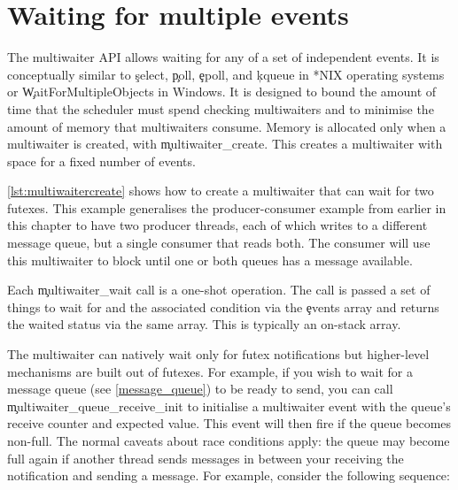 \section[label=multiwaiter]{Waiting for multiple events}

The multiwaiter API allows waiting for any of a set of independent events.
It is conceptually similar to \c{select}, \c{poll}, \c{epoll}, and \c{kqueue} in *NIX operating systems or \c{WaitForMultipleObjects} in Windows.
It is designed to bound the amount of time that the scheduler must spend checking multiwaiters and to minimise the amount of memory that multiwaiters consume.
Memory is allocated only when a multiwaiter is created, with \c{multiwaiter_create}.
This creates a multiwaiter with space for a fixed number of events.


\ref{lst:multiwaitercreate} shows how to create a multiwaiter that can wait for two futexes.
This example generalises the producer-consumer example from earlier in this chapter to have two producer threads, each of which writes to a different message queue, but a single consumer that reads both.
The consumer will use this multiwaiter to block until one or both queues has a message available.

\codelisting[filename=examples/multiwaiter/queue.cc,marker=multiwaiter_create,label=lst:multiwaitercreate,caption="Creating a multiwaiter object."]{}

Each \c{multiwaiter_wait} call is a one-shot operation.
The call is passed a set of things to wait for and the associated condition via the \c{events} array and returns the waited status via the same array.
This is typically an on-stack array.


The multiwaiter can natively wait only for futex notifications but higher-level mechanisms are built out of futexes.
For example, if you wish to wait for a message queue (see \ref{message_queue}) to be ready to send, you can call \c{multiwaiter_queue_receive_init} to initialise a multiwaiter event with the queue's receive counter and expected value.
This event will then fire if the queue becomes non-full.
The normal caveats about race conditions apply: the queue may become full again if another thread sends messages in between your receiving the notification and sending a message.
For example, consider the following sequence:

